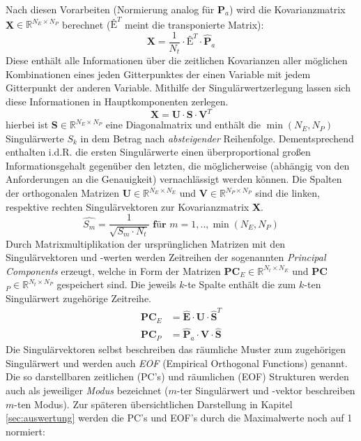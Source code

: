 \documentclass[12pt,a4paper,onecolumn,draft]{scrartcl}
\begin{document}
Nach diesen Vorarbeiten (Normierung analog für \textbf{P}$_a$) wird die Kovarianzmatrix \textbf{X}$\in \mathbb{R}^{N_E \times N_P}$ berechnet ($\textbf{\^{E}}^T$ meint die transponierte Matrix):
\begin{equation}
\textbf{X} = \frac{1}{N_t} \cdot \textbf{\^{E}}^T \cdot \hat{\textbf{P}}_a
\end{equation}
Diese enthält alle Informationen über die zeitlichen Kovarianzen aller möglichen Kombinationen eines jeden Gitterpunktes der einen Variable mit jedem Gitterpunkt der anderen Variable. Mithilfe der Singulärwertzerlegung lassen sich diese Informationen in Hauptkomponenten zerlegen.
\begin{equation}
\textbf{X} = \textbf{U} \cdot \textbf{S} \cdot \textbf{V}^T
\end{equation}
hierbei ist \textbf{S}$\in \mathbb{R}^{N_E \times N_P}$ eine Diagonalmatrix und enthält die $\min(N_E,N_P)$ Singulärwerte $S_k$ in dem Betrag nach \textit{absteigender} Reihenfolge. Dementsprechend enthalten i.d.R. die ersten Singulärwerte einen überproportional großen Informationsgehalt gegenüber den letzten, die möglicherweise (abhängig von den Anforderungen an die Genauigkeit) vernachlässigt werden können. Die Spalten der orthogonalen Matrizen \textbf{U}$\in \mathbb{R}^{N_E \times N_E}$ und \textbf{V}$\in \mathbb{R}^{N_P \times N_P}$ sind die linken, respektive rechten Singulärvektoren zur Kovarianzmatrix \textbf{X}. 
\begin{equation}
\hat{S_m}= \frac{1}{\sqrt{S_m\cdot N_t}}\textbf{ für } m=1,..,\min(N_E,N_P)
\end{equation}
Durch Matrixmultiplikation der ursprünglichen Matrizen mit den Singulärvektoren und -werten werden Zeitreihen der sogenannten \textit{Principal Components} erzeugt, welche in Form der Matrizen \textbf{PC}$_E\in \mathbb{R}^{N_t \times N_E}$ und \textbf{PC}$_P\in \mathbb{R}^{N_t \times N_P}$ gespeichert sind. Die jeweils $k$-te Spalte enthält die zum $k$-ten Singulärwert zugehörige Zeitreihe.
\begin{align}
\textbf{PC}_E &= \hat{\textbf{E}} \cdot \textbf{U} \cdot \hat{\textbf{S}}^T \\ \textbf{PC}_P &= \hat{\textbf{P}}_a \cdot \textbf{V} \cdot \hat{\textbf{S}}
\end{align}
Die Singulärvektoren selbst beschreiben das räumliche Muster zum zugehörigen Singulärwert und werden auch \textit{EOF} (Empirical Orthogonal Functions) genannt. Die so darstellbaren zeitlichen (PC's) und räumlichen (EOF) Strukturen werden auch als jeweiliger \textit{Modus} bezeichnet ($m$-ter Singulärwert und -vektor beschreiben $m$-ten Modus). Zur späteren übersichtlichen Darstellung in Kapitel \ref{sec:auswertung} werden die PC's und EOF's durch die Maximalwerte noch auf 1 normiert:
\end{document}
